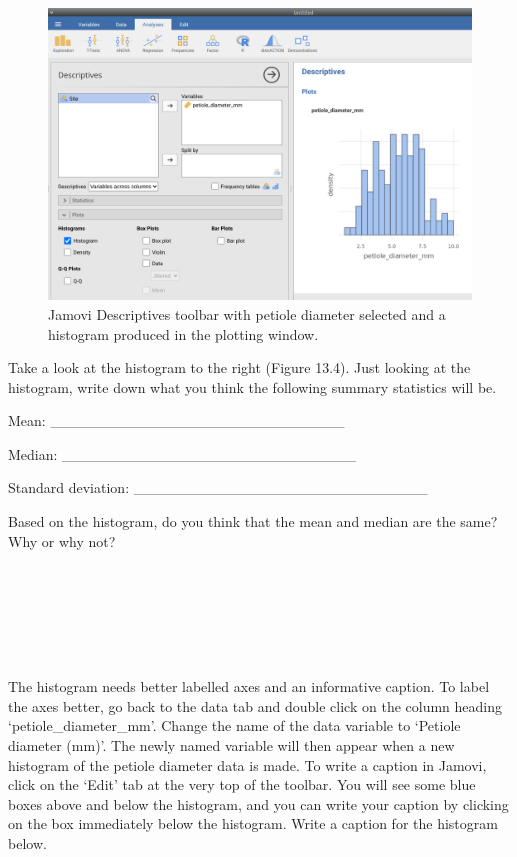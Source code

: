\documentclass[
]{scrbook}
\begin{document}
\begin{figure}
\includegraphics[width=1\linewidth]{img/lilypad_histogram} \caption{Jamovi Descriptives toolbar with petiole diameter selected and a histogram produced in the plotting window.}\label{fig:unnamed-chunk-48}
\end{figure}

Take a look at the histogram to the right (Figure 13.4).
Just looking at the histogram, write down what you think the following summary statistics will be.

Mean: \_\_\_\_\_\_\_\_\_\_\_\_\_\_\_\_\_\_\_\_\_\_\_\_\_\_\_\_

Median: \_\_\_\_\_\_\_\_\_\_\_\_\_\_\_\_\_\_\_\_\_\_\_\_\_\_\_\_

Standard deviation: \_\_\_\_\_\_\_\_\_\_\_\_\_\_\_\_\_\_\_\_\_\_\_\_\_\_\_\_

Based on the histogram, do you think that the mean and median are the same? Why or why not?

\begin{verbatim}






\end{verbatim}

The histogram needs better labelled axes and an informative caption.
To label the axes better, go back to the data tab and double click on the column heading `petiole\_diameter\_mm'.
Change the name of the data variable to `Petiole diameter (mm)'.
The newly named variable will then appear when a new histogram of the petiole diameter data is made.
To write a caption in Jamovi, click on the `Edit' tab at the very top of the toolbar.
You will see some blue boxes above and below the histogram, and you can write your caption by clicking on the box immediately below the histogram.
Write a caption for the histogram below.
\end{document}

